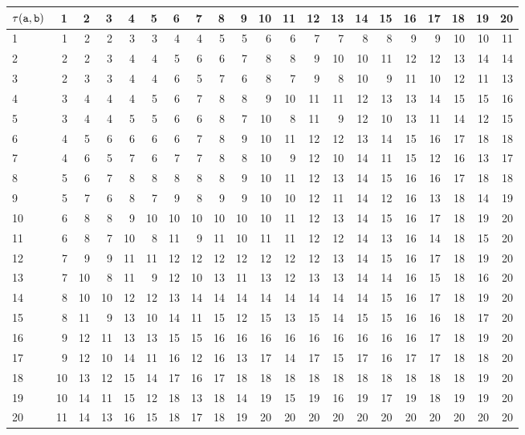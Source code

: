 \begin{tabular}{l|rrrrrrrrrrrrrrrrrrrr}
 $\tau(\mathtt{a},\mathtt{b})$ &  1 &  2 &  3 &  4 &  5 &  6 &  7 &  8 &  9 & 10 & 11 & 12 & 13 & 14 & 15 & 16 & 17 & 18 & 19 & 20 \\
\hline
 1        &  1 &  2 &  2 &  3 &  3 &  4 &  4 &  5 &  5 &  6 &  6 &  7 &  7 &  8 &  8 &  9 &  9 & 10 & 10 & 11 \\
 2        &  2 &  2 &  3 &  4 &  4 &  5 &  6 &  6 &  7 &  8 &  8 &  9 & 10 & 10 & 11 & 12 & 12 & 13 & 14 & 14 \\
 3        &  2 &  3 &  3 &  4 &  4 &  6 &  5 &  7 &  6 &  8 &  7 &  9 &  8 & 10 &  9 & 11 & 10 & 12 & 11 & 13 \\
 4        &  3 &  4 &  4 &  4 &  5 &  6 &  7 &  8 &  8 &  9 & 10 & 11 & 11 & 12 & 13 & 13 & 14 & 15 & 15 & 16 \\
 5        &  3 &  4 &  4 &  5 &  5 &  6 &  6 &  8 &  7 & 10 &  8 & 11 &  9 & 12 & 10 & 13 & 11 & 14 & 12 & 15 \\
 6        &  4 &  5 &  6 &  6 &  6 &  6 &  7 &  8 &  9 & 10 & 11 & 12 & 12 & 13 & 14 & 15 & 16 & 17 & 18 & 18 \\
 7        &  4 &  6 &  5 &  7 &  6 &  7 &  7 &  8 &  8 & 10 &  9 & 12 & 10 & 14 & 11 & 15 & 12 & 16 & 13 & 17 \\
 8        &  5 &  6 &  7 &  8 &  8 &  8 &  8 &  8 &  9 & 10 & 11 & 12 & 13 & 14 & 15 & 16 & 16 & 17 & 18 & 18 \\
 9        &  5 &  7 &  6 &  8 &  7 &  9 &  8 &  9 &  9 & 10 & 10 & 12 & 11 & 14 & 12 & 16 & 13 & 18 & 14 & 19 \\
 10       &  6 &  8 &  8 &  9 & 10 & 10 & 10 & 10 & 10 & 10 & 11 & 12 & 13 & 14 & 15 & 16 & 17 & 18 & 19 & 20 \\
 11       &  6 &  8 &  7 & 10 &  8 & 11 &  9 & 11 & 10 & 11 & 11 & 12 & 12 & 14 & 13 & 16 & 14 & 18 & 15 & 20 \\
 12       &  7 &  9 &  9 & 11 & 11 & 12 & 12 & 12 & 12 & 12 & 12 & 12 & 13 & 14 & 15 & 16 & 17 & 18 & 19 & 20 \\
 13       &  7 & 10 &  8 & 11 &  9 & 12 & 10 & 13 & 11 & 13 & 12 & 13 & 13 & 14 & 14 & 16 & 15 & 18 & 16 & 20 \\
 14       &  8 & 10 & 10 & 12 & 12 & 13 & 14 & 14 & 14 & 14 & 14 & 14 & 14 & 14 & 15 & 16 & 17 & 18 & 19 & 20 \\
 15       &  8 & 11 &  9 & 13 & 10 & 14 & 11 & 15 & 12 & 15 & 13 & 15 & 14 & 15 & 15 & 16 & 16 & 18 & 17 & 20 \\
 16       &  9 & 12 & 11 & 13 & 13 & 15 & 15 & 16 & 16 & 16 & 16 & 16 & 16 & 16 & 16 & 16 & 17 & 18 & 19 & 20 \\
 17       &  9 & 12 & 10 & 14 & 11 & 16 & 12 & 16 & 13 & 17 & 14 & 17 & 15 & 17 & 16 & 17 & 17 & 18 & 18 & 20 \\
 18       & 10 & 13 & 12 & 15 & 14 & 17 & 16 & 17 & 18 & 18 & 18 & 18 & 18 & 18 & 18 & 18 & 18 & 18 & 19 & 20 \\
 19       & 10 & 14 & 11 & 15 & 12 & 18 & 13 & 18 & 14 & 19 & 15 & 19 & 16 & 19 & 17 & 19 & 18 & 19 & 19 & 20 \\
 20       & 11 & 14 & 13 & 16 & 15 & 18 & 17 & 18 & 19 & 20 & 20 & 20 & 20 & 20 & 20 & 20 & 20 & 20 & 20 & 20 \\
\hline
\end{tabular}
